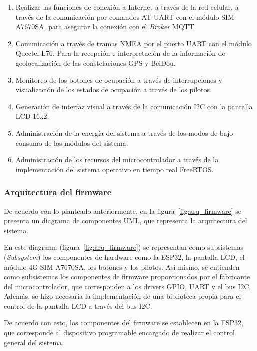 \begin{enumerate}
 \item Realizar las funciones de conexión a Internet a través de la red celular, a través de la comunicación por comandos AT-UART con el módulo SIM A7670SA, para asegurar la conexión con el \textit{Broker} MQTT.
 \item Comunicación a través de tramas NMEA por el puerto UART con el módulo Quectel L76. Para la recepción e interpretación de la información de geolocalización de las constelaciones GPS y BeiDou.  
 \item Monitoreo de los botones de ocupación a través de interrupciones y visualización de los estados de ocupación a través de los pilotos. 
 \item Generación de interfaz visual a través de la comunicación I2C con la pantalla LCD 16x2. 
 \item Administración de la energía del sistema a través de los modos de bajo consumo de los módulos del sistema. 
 \item Administración de los recursos del microcontrolador a través de la implementación del sistema operativo en tiempo real FreeRTOS. 
\end{enumerate}

\subsubsection{Arquitectura del firmware}
\label{sec:arquitectura_firmware}

De acuerdo con lo planteado anteriormente, en la figura~\ref{fig:arq_firmware} se presenta un diagrama de componentes UML, que representa la arquitectura del sistema. 

En este diagrama (figura~\ref{fig:arq_firmware}) se representan como subsistemas (\textit{Subsystem}) los componentes de hardware como la ESP32, la pantalla LCD, el módulo 4G SIM A7670SA, los botones y los pilotos. Así mismo, se entienden como subsistemas los componentes de firmware proporcionados por el fabricante del microcontrolador, que corresponden a los drivers GPIO, UART y el bus I2C. Además, se hizo necesaria la implementación de una biblioteca propia para el control de la pantalla LCD a través del bus I2C.

De acuerdo con esto, los componentes del firmware se establecen en la ESP32, que corresponde al dispositivo programable encargado de realizar el control general del sistema. 

